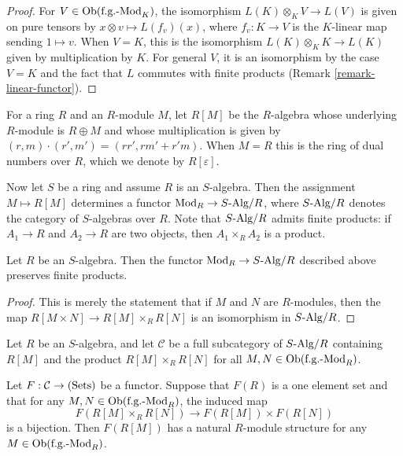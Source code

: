 \begin{proof}
For $V \in \textnormal{Ob}(\textnormal{f.g.-Mod}_{K})$, the isomorphism $L(K) 
\otimes_{K} V \rightarrow L(V)$ is given on pure tensors by $x \otimes v 
\mapsto L(f_{v})(x)$, where $f_{v}: K \rightarrow V$ is the $K$-linear map 
sending $1 \mapsto v$.  When $V = K$, this is the isomorphism $L(K) \otimes_{K} 
K \rightarrow L(K)$ given by multiplication by $K$.  For general $V$, it is an 
isomorphism by the case $V = K$ and the fact that $L$ commutes with finite 
products (Remark \ref{remark-linear-functor}).
\end{proof}

\noindent 
For a ring $R$ and an $R$-module $M$, let $R[M]$ be the $R$-algebra whose 
underlying $R$-module is $R \oplus M$ and whose multiplication is given by 
$(r,m) \cdot (r',m') = (rr', rm' + r'm)$.  When $M = R$ this is the ring of 
dual numbers over $R$, which we denote by $R[\varepsilon]$.  

\medskip \noindent
Now let $S$ be a ring and assume $R$ is an $S$-algebra.  Then the assignment $M 
\mapsto R[M]$ determines a functor $\textnormal{Mod}_{R} \rightarrow S 
\textnormal{-Alg}/R$, where $S \textnormal{-Alg}/R$ denotes the category of 
$S$-algebras over $R$.  Note that $S \textnormal{-Alg}/R$ admits finite 
products: if $A_1 \rightarrow R$ and $A_2 \rightarrow R$ are two objects, then 
$A_1 \times_{R} A_2$ is a product.

\begin{lemma}
\label{lemma-preserves-products}
Let $R$ be an $S$-algebra. Then the functor $\textnormal{Mod}_{R} \rightarrow S 
\textnormal{-Alg}/R$ described above preserves finite products.
\end{lemma}

\begin{proof}
This is merely the statement that if $M$ and $N$ are $R$-modules, then the map 
$R[M \times N] \rightarrow R[M] \times_{R} R[N]$ is an isomorphism in $S 
\textnormal{-Alg}/R$.
\end{proof}

\begin{lemma}
\label{lemma-tangent-space-functor}
Let $R$ be an $S$-algebra, and let $\mathcal C$ be a full subcategory of $S 
\textnormal{-Alg}/R$ containing $R[M]$ and the product $R[M] \times_{R} R[N]$ 
for all $M,N \in \textnormal{Ob}(\textnormal{f.g.-Mod}_{R})$.  

\smallskip \noindent
Let $F: \mathcal C \rightarrow \textnormal{(Sets)}$ be a functor.  Suppose that 
$F(R)$ is a one element set and that for any $M, N \in 
\textnormal{Ob}(\textnormal{f.g.-Mod}_{R})$, the induced map 
\[ F(R[M] \times_{R} R[N]) \rightarrow F(R[M]) \times F(R[N])\]
is a bijection.  Then $F(R[M])$ has a natural $R$-module structure for any $M 
\in \textnormal{Ob}(\textnormal{f.g.-Mod}_{R})$.
\end{lemma}


